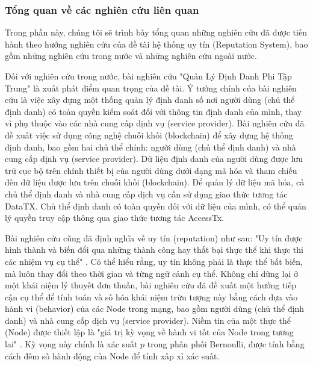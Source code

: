 \documentclass{article}[14pt]
\begin{document}
{        \subsubsection{Tổng quan về các nghiên cứu liên quan} 
            Trong phần này, chúng tôi sẽ trình bày tổng quan những nghiên cứu đã được tiến hành theo hướng nghiên cứu của đề tài hệ thống uy tín (Reputation System), bao gồm những nghiên cứu trong nước và những nghiên cứu ngoài nước. 
            \par
            Đối với nghiên cứu trong nước, bài nghiên cứu "Quản Lý Định Danh Phi Tập Trung" \cite{quan-ly-dinh-danh-phi-tap-trung} là xuất phát điểm quan trọng của đề tài. Ý tưởng chính của bài nghiên cứu là việc xây dựng một thống quản lý định danh số nơi người dùng (chủ thể định danh) có toàn quyền kiểm soát đối với thông tin định danh của mình, thay vì phụ thuộc vào các nhà cung cấp dịnh vụ (service provider). Bài nghiên cứu đã đề xuất việc sử dụng công nghệ chuỗi khối (blockchain) để xây dựng hệ thống định danh, bao gồm hai chủ thể chính: người dùng (chủ thể định danh) và nhà cung cấp dịnh vụ (service provider). Dữ liệu định danh của người dùng được lưu trữ cục bộ trên chính thiết bị của người dùng dưới dạng mã hóa và tham chiếu đến dữ liệu được lưu trên chuỗi khối (blockchain). Để quản lý dữ liệu mã hóa, cả chủ thể định danh và nhà cung cấp dịch vụ cần sử dụng giao thức tương tác DataTX. Chủ thể định danh có toàn quyền đối với dữ liệu của mình, có thể quản lý quyền truy cập thông qua giao thức tương tác AccessTx. 
            \par
            Bài nghiên cứu cũng đã định nghĩa về uy tín (reputation) như sau: "Uy tín được hình thành và biến đổi qua những thành công hay thất bại thực thể khi thực thi các nhiệm vụ cụ thể" \cite{quan-ly-dinh-danh-phi-tap-trung,a-survey-of-trust-in-internet-applications}. Có thể hiểu rằng, uy tín không phải là thực thể bất biến, mà luôn thay đổi theo thời gian và từng ngữ cảnh cụ thể. Không chỉ dừng lại ở một khái niệm lý thuyết đơn thuần, bài nghiên cứu đã đề xuất một hướng tiếp cận cụ thể để tính toán và số hóa khái niệm trừu tượng này bằng cách dựa vào hành vi (behavior) của các Node trong mạng, bao gồm người dùng (chủ thể định danh) và nhà cung cấp dịch vụ (service provider). Niềm tin của một thực thể (Node) được thiết lập là "giá trị kỳ vọng về hành vi tốt của Node trong tương lai" \cite{quan-ly-dinh-danh-phi-tap-trung}. Kỳ vọng này chính là xác suất \(p\) trong phân phối Bernoulli, được tính bằng cách đếm số hành động của Node để tính xấp xỉ xác suất. \cite{thong-ke-may-tinh,quan-ly-dinh-danh-phi-tap-trung} 
}
\end{document}
